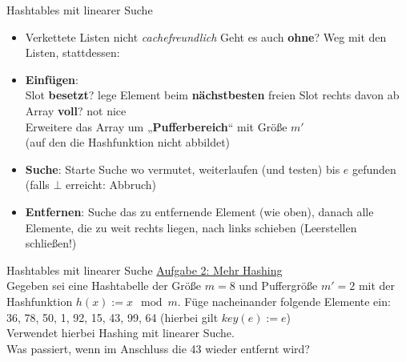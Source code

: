 \begin{frame}{Hashtables mit linearer Suche}
	\begin{itemize}
		\item Verkettete Listen nicht \textit{cachefreundlich} \impl Geht es auch \textbf{ohne}?
		\pause
		\implitem Weg mit den Listen, stattdessen:
		\pause 
		\item \textbf{Einfügen}: \\ 
		Slot \textbf{besetzt}? \impl lege Element beim \textbf{nächstbesten} freien Slot rechts davon ab\\
		\pause
		Array \textbf{voll}? \impl not nice \\ 
		\impl Erweitere das Array um „\textbf{Pufferbereich}“ mit Größe $m'$ \\ (auf den die Hashfunktion nicht abbildet)
		\pause
		\item \textbf{Suche}: Starte Suche wo vermutet, weiterlaufen (und testen) bis $e$ gefunden (falls $\bot$ erreicht: Abbruch)
		\pause
		\item \textbf{Entfernen}: Suche das zu entfernende Element (wie oben), danach alle Elemente, die zu weit rechts liegen, nach links schieben (\impl Leerstellen schließen!)
	\end{itemize}
\end{frame}


\begin{frame}{Hashtables mit linearer Suche}
	\underline{Aufgabe 2: Mehr Hashing} \\
	Gegeben sei eine Hashtabelle der Größe $m = 8$ und Puffergröße $m' = 2$ mit der Hashfunktion $h(x) := x \mod m$. Füge nacheinander folgende Elemente ein: \\ 36, 78, 50, 1, 92, 15, 43, 99, 64 \quad (hierbei gilt $key(e) := e$) \\
	Verwendet hierbei Hashing mit linearer Suche. \\ 
	Was passiert, wenn im Anschluss die 43 wieder entfernt wird?
\end{frame}

